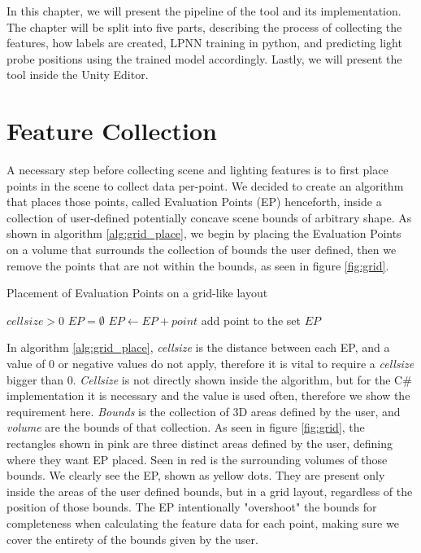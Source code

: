 In this chapter, we will present the pipeline of the tool and its implementation. The chapter will be split into five parts, describing the process of collecting the features, how labels are created, LPNN training in python, and predicting light probe positions using the trained model accordingly. Lastly, we will present the tool inside the Unity Editor.

\section{Feature Collection}
A necessary step before collecting scene and lighting features is to first place points in the scene to collect data per-point. We decided to create an algorithm that places those points, called Evaluation Points (EP) henceforth, inside a collection of user-defined potentially concave scene bounds of arbitrary shape. As shown in algorithm \ref{alg:grid_place}, we begin by placing the Evaluation Points on a volume that surrounds the collection of bounds the user defined, then we remove the points that are not within the bounds, as seen in figure \ref{fig:grid}.


\begin{algorithm}
	\caption{Placement of Evaluation Points on a grid-like layout}
	\label{alg:grid_place}
	\begin{algorithmic}[1]
		\Require $cellsize > 0$
		\State $EP = \emptyset$
				\State $EP \gets EP + point$ \Comment add point to the set
			\EndIf
		\EndFor
		\State \Return $EP$
	\end{algorithmic}
\end{algorithm}

In algorithm \ref{alg:grid_place}, \textit{cellsize} is the distance between each EP, and a value of 0 or negative values do not apply, therefore it is vital to require a \textit{cellsize} bigger than 0. \textit{Cellsize} is not directly shown inside the algorithm, but for the C\# implementation it is necessary and the value is used often, therefore we show the requirement here. \textit{Bounds} is the collection of 3D areas defined by the user, and \textit{volume} are the bounds of that collection. As seen in figure \ref{fig:grid}, the rectangles shown in pink are three distinct areas defined by the user, defining where they want EP placed. Seen in red is the surrounding volumes of those bounds. We clearly see the EP, shown as yellow dots. They are present only inside the areas of the user defined bounds, but in a grid layout, regardless of the position of those bounds. The EP intentionally "overshoot" the bounds for completeness when calculating the feature data for each point, making sure we cover the entirety of the bounds given by the user.

